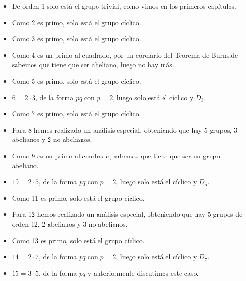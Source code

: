 \begin{itemize}
    \item De orden 1 solo está el grupo trivial, como vimos en los primeros capítulos.
    \item Como 2 es primo, solo está el grupo cíclico.
    \item Como 3 es primo, solo está el grupo cíclico.
    \item Como 4 es un primo al cuadrado, por un corolario del Teorema de Burnside sabemos que tiene que ser abeliano, luego no hay más.
    \item Como 5 es primo, solo está el grupo cíclico.
    \item $6 = 2\cdot 3$, de la forma $pq$ con $p=2$, luego solo está el cíclico y $D_3$.
    \item Como 7 es primo, solo está el grupo cíclico.
    \item Para 8 hemos realizado un análisis especial, obteniendo que hay 5 grupos, 3 abelianos y 2 no abelianos.
    \item Como 9 es un primo al cuadrado, sabemos que tiene que ser un grupo abeliano.
    \item $10 = 2\cdot 5$, de la forma $pq$ con $p =2$, luego solo está el cíclico y $D_5$.
    \item Como 11 es primo, solo está el grupo cíclico.
    \item Para 12 hemos realizado un análisis especial, obteniendo que hay 5 grupos de orden 12, 2 abelianos y 3 no abelianos.
    \item Como 13 es primo, solo está el grupo cíclico.
    \item $14 = 2\cdot 7$, de la forma $pq$ con $p=2$, luego solo está el cíclico y $D_7$.
    \item $15 = 3\cdot 5$, de la forma $pq$ y anteriormente discutimos este caso.
\end{itemize}
